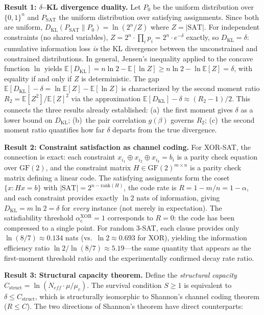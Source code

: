 \documentclass[11pt,a4paper]{article}
\begin{document}
\textbf{Result 1: $\delta$--KL divergence duality.} Let $P_0$ be the uniform distribution over $\{0,1\}^n$ and $P_{\text{SAT}}$ the uniform distribution over satisfying assignments. Since both are uniform, $D_{\text{KL}}(P_{\text{SAT}} \| P_0) = \ln(2^n / Z)$ where $Z = |\text{SAT}|$. For independent constraints (no shared variables), $Z = 2^n \cdot \prod_i p_i = 2^n \cdot e^{-\delta}$ exactly, so $D_{\text{KL}} = \delta$: cumulative information loss \emph{is} the KL divergence between the unconstrained and constrained distributions. In general, Jensen's inequality applied to the concave function $\ln$ yields $\mathbb{E}[D_{\text{KL}}] = n \ln 2 - \mathbb{E}[\ln Z] \geq n \ln 2 - \ln \mathbb{E}[Z] = \delta$, with equality if and only if $Z$ is deterministic. The gap $\mathbb{E}[D_{\text{KL}}] - \delta = \ln \mathbb{E}[Z] - \mathbb{E}[\ln Z]$ is characterized by the second moment ratio $R_2 = \mathbb{E}[Z^2]/\mathbb{E}[Z]^2$ via the approximation $\mathbb{E}[D_{\text{KL}}] - \delta \approx (R_2 - 1)/2$. This connects the three results already established: (a)~the first moment gives $\delta$ as a lower bound on $D_{\text{KL}}$; (b)~the pair correlation $g(\beta)$ governs $R_2$; (c)~the second moment ratio quantifies how far $\delta$ departs from the true divergence.

\textbf{Result 2: Constraint satisfaction as channel coding.} For XOR-SAT, the connection is exact: each constraint $x_{i_1} \oplus x_{i_2} \oplus x_{i_3} = b_i$ is a parity check equation over $\text{GF}(2)$, and the constraint matrix $H \in \text{GF}(2)^{m \times n}$ is a parity check matrix defining a linear code. The satisfying assignments form the coset $\{x : Hx = b\}$ with $|{\text{SAT}}| = 2^{n - \text{rank}(H)}$, the code rate is $R = 1 - m/n = 1 - \alpha$, and each constraint provides exactly $\ln 2$ nats of information, giving $D_{\text{KL}} = m \ln 2 = \delta$ for \emph{every} instance (not merely in expectation). The satisfiability threshold $\alpha_c^{\text{XOR}} = 1$ corresponds to $R = 0$: the code has been compressed to a single point. For random 3-SAT, each clause provides only $\ln(8/7) \approx 0.134$ nats (vs.\ $\ln 2 \approx 0.693$ for XOR), yielding the information efficiency ratio $\ln 2 / \ln(8/7) \approx 5.19$---the same quantity that appears as the first-moment threshold ratio and the experimentally confirmed decay rate ratio.

\textbf{Result 3: Structural capacity theorem.} Define the \emph{structural capacity} $C_{\text{struct}} = \ln(N_{eff} \cdot \mu/\mu_c)$. The survival condition $S \geq 1$ is equivalent to $\delta \leq C_{\text{struct}}$, which is structurally isomorphic to Shannon's channel coding theorem ($R \leq C$). The two directions of Shannon's theorem have direct counterparts:
\end{document}
